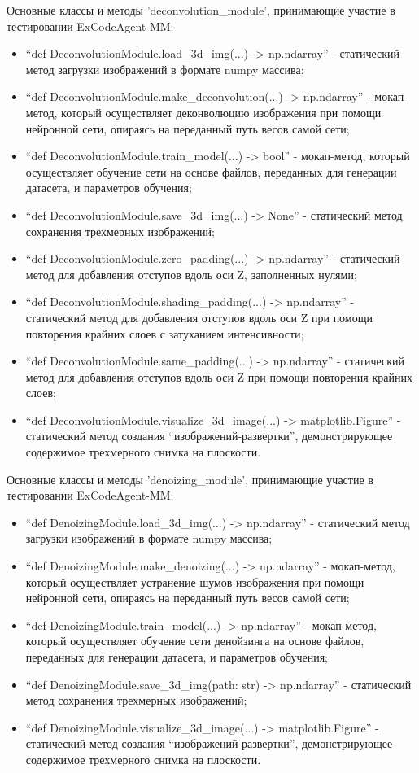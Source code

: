 Основные классы и методы 'deconvolution\_module', принимающие участие в тестировании ExCodeAgent-MM:
\begin{itemize}
	\item ``def DeconvolutionModule.load\_3d\_img(...) -> np.ndarray'' - статический метод загрузки
изображений в формате numpy массива;
	\item ``def DeconvolutionModule.make\_deconvolution(...) -> np.ndarray'' - мокап-метод, который 
осуществляет деконволюцию изображения при помощи нейронной сети, опираясь на переданный путь весов 
самой сети;
	\item ``def DeconvolutionModule.train\_model(...) -> bool'' - мокап-метод, который
осуществляет обучение сети на основе файлов, переданных для генерации датасета, и параметров обучения;
	\item ``def DeconvolutionModule.save\_3d\_img(...) -> None'' - статический метод сохранения
трехмерных изображений;
	\item ``def DeconvolutionModule.zero\_padding(...) -> np.ndarray'' - статический метод 
для добавления отступов вдоль оси Z, заполненных нулями;
	\item ``def DeconvolutionModule.shading\_padding(...) -> np.ndarray'' - статический метод 
для добавления отступов вдоль оси Z при помощи повторения крайних слоев с затуханием интенсивности;
	\item ``def DeconvolutionModule.same\_padding(...) -> np.ndarray'' - статический метод для добавления
отступов вдоль оси Z при помощи повторения крайних слоев;
	\item ``def DeconvolutionModule.visualize\_3d\_image(...) -> matplotlib.Figure'' - 
статический метод создания ``изображений-развертки'', демонстрирующее содержимое трехмерного снимка
на плоскости.
\end{itemize}

Основные классы и методы 'denoizing\_module', принимающие участие в тестировании ExCodeAgent-MM:
\begin{itemize}
	\item ``def DenoizingModule.load\_3d\_img(...) -> np.ndarray'' - статический метод загрузки
изображений в формате numpy массива;
	\item ``def DenoizingModule.make\_denoizing(...) -> np.ndarray'' - мокап-метод, который 
осуществляет устранение шумов изображения при помощи нейронной сети, опираясь на переданный путь весов самой сети;
	\item ``def DenoizingModule.train\_model(...) -> np.ndarray'' - мокап-метод, который осуществляет 
обучение сети денойзинга на основе файлов, переданных для генерации датасета, и параметров обучения;
	\item ``def DenoizingModule.save\_3d\_img(path: str) -> np.ndarray'' - статический метод сохранения
трехмерных изображений;
	\item ``def DenoizingModule.visualize\_3d\_image(...) -> matplotlib.Figure'' - 
статический метод создания ``изображений-развертки'', демонстрирующее содержимое трехмерного снимка
на плоскости.
\end{itemize}

